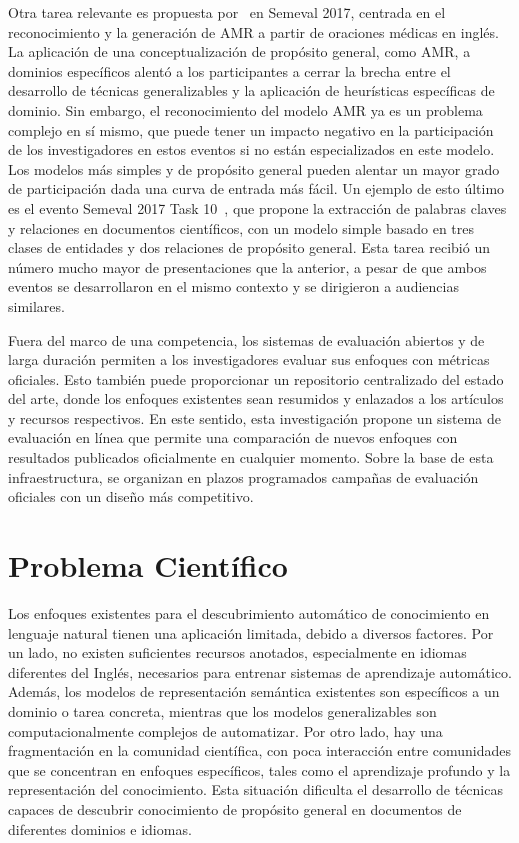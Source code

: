 Otra tarea relevante es propuesta por~\citet{semeval2017-task9} en Semeval 2017, centrada en el reconocimiento y la generación de AMR a partir de oraciones médicas en inglés.
La aplicación de una conceptualización de propósito general, como AMR, a dominios específicos alentó a los participantes a cerrar la brecha entre el desarrollo de técnicas generalizables y la aplicación de heurísticas específicas de dominio.
Sin embargo, el reconocimiento del modelo AMR ya es un problema complejo en sí mismo, que puede tener un impacto negativo en la participación de los investigadores en estos eventos si no están especializados en este modelo.
Los modelos más simples y de propósito general pueden alentar un mayor grado de participación dada una curva de entrada más fácil.
Un ejemplo de esto último es el evento Semeval 2017 Task 10~\cite{semeval2017-task10}, que propone la extracción de palabras claves y relaciones en documentos científicos, con un modelo simple basado en tres clases de entidades y dos relaciones de propósito general.
Esta tarea recibió un número mucho mayor de presentaciones que la anterior, a pesar de que ambos eventos se desarrollaron en el mismo contexto y se dirigieron a audiencias similares.

Fuera del marco de una competencia, los sistemas de evaluación abiertos y de larga duración permiten
a los investigadores evaluar sus enfoques con métricas oficiales. Esto también puede proporcionar un repositorio centralizado del estado del arte, donde los enfoques existentes sean resumidos y enlazados a los artículos y recursos respectivos.
En este sentido, esta investigación propone un sistema de evaluación en línea que permite una comparación de
nuevos enfoques con resultados publicados oficialmente en cualquier momento. Sobre la base de esta infraestructura, se organizan en plazos programados campañas de evaluación oficiales con un diseño más competitivo.

\section{Problema Científico}
\label{chap1:problem}

Los enfoques existentes para el descubrimiento automático de conocimiento en lenguaje natural tienen una aplicación limitada, debido a diversos factores.
Por un lado, no existen suficientes recursos anotados, especialmente en idiomas diferentes del Inglés, necesarios para entrenar sistemas de aprendizaje automático.
Además, los modelos de representación semántica existentes son específicos a un dominio o tarea concreta, mientras que los modelos generalizables son computacionalmente complejos de automatizar.
Por otro lado, hay una fragmentación en la comunidad científica, con poca interacción entre comunidades que se concentran en enfoques específicos, tales como el aprendizaje profundo y la representación del conocimiento.
Esta situación dificulta el desarrollo de técnicas capaces de descubrir conocimiento de propósito general en documentos de diferentes dominios e idiomas.

